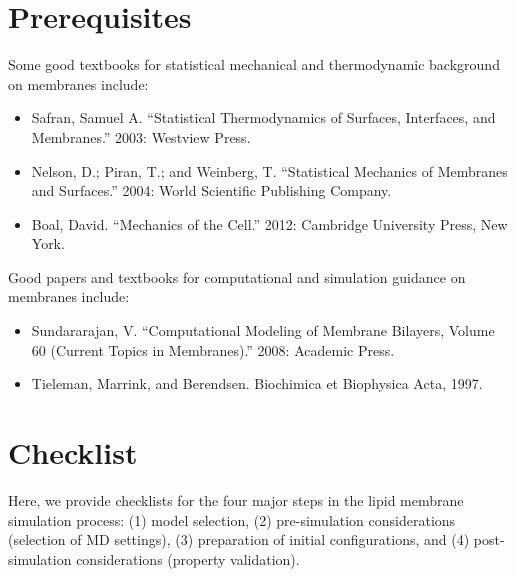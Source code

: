 \documentclass[9pt,bestpractices]{livecoms}
\begin{document}
\section{Prerequisites}
Some good textbooks for statistical mechanical and thermodynamic background on membranes include:

\begin{itemize}
	\item Safran, Samuel A. ``Statistical Thermodynamics of Surfaces, Interfaces, and Membranes.'' 2003: Westview Press.
	\item Nelson, D.; Piran, T.; and Weinberg, T. ``Statistical Mechanics of Membranes and Surfaces.'' 2004: World Scientific Publishing Company.
	\item Boal, David. ``Mechanics of the Cell.'' 2012: Cambridge University Press, New York.
\end{itemize}

Good papers and textbooks for computational and simulation guidance on membranes include:

\begin{itemize}
	\item Sundararajan, V. ``Computational Modeling of Membrane Bilayers, Volume 60 (Current Topics in Membranes).'' 2008: Academic Press.
	\item Tieleman, Marrink, and Berendsen. Biochimica et Biophysica Acta, 1997.
\end{itemize}

\section{Checklist}
Here, we provide checklists for the four major steps in the lipid membrane simulation process: (1) model selection, (2) pre-simulation considerations (selection of MD settings), (3) preparation of initial configurations, and (4) post-simulation considerations (property validation).
\end{document}
